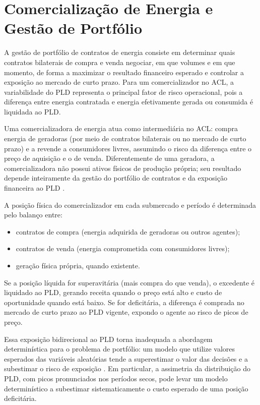 \section{Comercialização de Energia e Gestão de Portfólio}
\label{sec:portfolio}

A gestão de portfólio de contratos de energia consiste em determinar quais contratos bilaterais de compra e venda negociar, em que volumes e em que momento, de forma a maximizar o resultado financeiro esperado e controlar a exposição ao mercado de curto prazo. Para um comercializador no ACL, a variabilidade do PLD representa o principal fator de risco operacional, pois a diferença entre energia contratada e energia efetivamente gerada ou consumida é liquidada ao PLD.

Uma comercializadora de energia atua como intermediária no ACL: compra energia de geradoras (por meio de contratos bilaterais ou no mercado de curto prazo) e a revende a consumidores livres, assumindo o risco da diferença entre o preço de aquisição e o de venda. Diferentemente de uma geradora, a comercializadora não possui ativos físicos de produção própria; seu resultado depende inteiramente da gestão do portfólio de contratos e da exposição financeira ao PLD \cite{bessa2006,guerreiro2017}.

A posição física do comercializador em cada submercado e período é determinada pelo balanço entre:
\begin{itemize}
  \item contratos de compra (energia adquirida de geradoras ou outros agentes);
  \item contratos de venda (energia comprometida com consumidores livres);
  \item geração física própria, quando existente.
\end{itemize}

Se a posição líquida for superavitária (mais compra do que venda), o excedente é liquidado ao PLD, gerando receita quando o preço está alto e custo de oportunidade quando está baixo. Se for deficitária, a diferença é comprada no mercado de curto prazo ao PLD vigente, expondo o agente ao risco de picos de preço.

Essa exposição bidirecional ao PLD torna inadequada a abordagem determinística para o problema de portfólio: um modelo que utilize valores esperados das variáveis aleatórias tende a superestimar o valor das decisões e a subestimar o risco de exposição \cite{birge2011}. Em particular, a assimetria da distribuição do PLD, com picos pronunciados nos períodos secos, pode levar um modelo determinístico a subestimar sistematicamente o custo esperado de uma posição deficitária.

